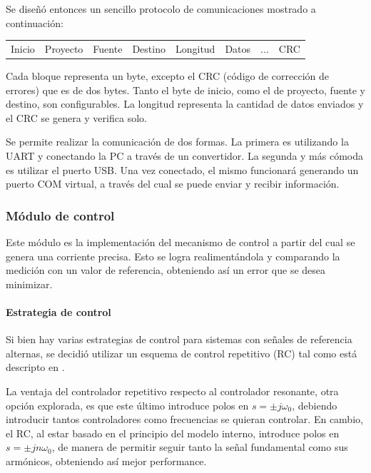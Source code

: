 \documentclass[titlepage, 12pt]{article}
\begin{document}
Se diseñó entonces un sencillo protocolo de comunicaciones mostrado a continuación:

\begin{table}[!htbp]
    \centering
    \begin{tabular}{c|c|c|c|c|c|c|c}
    Inicio & Proyecto & Fuente & Destino & Longitud & Datos & $...$ & CRC
    \end{tabular}
\end{table}

Cada bloque representa un byte, excepto el CRC (código de corrección de errores) que es de dos bytes. Tanto el byte de inicio, como el de proyecto, fuente y destino, son configurables. La longitud representa la cantidad de datos enviados y el CRC se genera y verifica solo.

Se permite realizar la comunicación de dos formas. La primera es utilizando la UART y conectando la PC a través de un convertidor. La segunda y más cómoda es utilizar el puerto USB. Una vez conectado, el mismo funcionará generando un puerto COM virtual, a través del cual se puede enviar y recibir información.

\subsubsection{Módulo de control}
Este módulo es la implementación del mecanismo de control a partir del cual se genera una corriente precisa. Esto se logra realimentándola y comparando la medición con un valor de referencia, obteniendo así un error que se desea minimizar.

\paragraph{Estrategia de control}
Si bien hay varias estrategias de control para sistemas con señales de referencia alternas, se decidió utilizar un esquema de control repetitivo (RC) tal como está descripto en \cite{control-lic}.

La ventaja del controlador repetitivo respecto al controlador resonante, otra opción explorada, es que este último introduce polos en $s = \pm j\omega_0$, debiendo introducir tantos controladores como frecuencias se quieran controlar. En cambio, el RC, al estar basado en el principio del modelo interno, introduce polos en $s = \pm jn\omega_0$, de manera de permitir seguir tanto la señal fundamental como sus armónicos, obteniendo así mejor performance.
\end{document}
